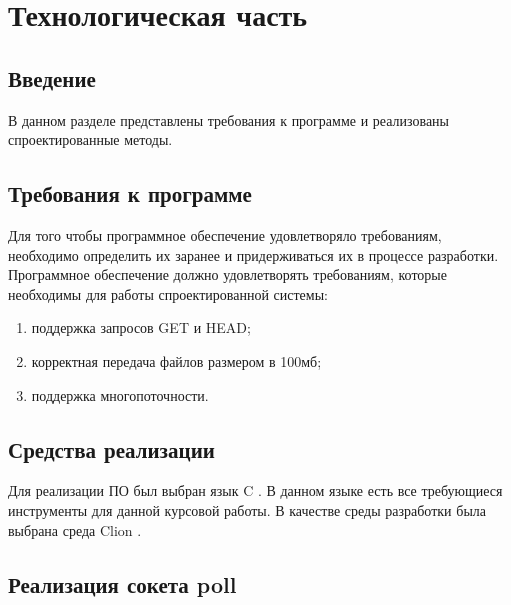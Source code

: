 \section{\large Технологическая часть}

\subsection*{Введение}

В данном разделе представлены требования к программе и реализованы спроектированные методы.

\subsection{Требования к программе}

Для того чтобы программное обеспечение удовлетворяло требованиям, необходимо определить их заранее и придерживаться их в процессе разработки. 
Программное обеспечение должно удовлетворять требованиям, которые необходимы для работы спроектированной системы:

\begin{enumerate}
    \item поддержка запросов GET и HEAD;
    \item корректная передача файлов размером в 100мб;
    \item поддержка многопоточности.
\end{enumerate}

\subsection{Средства реализации}

Для реализации ПО был выбран язык C \cite{C}.
В данном языке есть все требующиеся инструменты для данной курсовой работы.
В качестве среды разработки была выбрана среда Clion \cite{vscode}.

\subsection{Реализация сокета poll}

